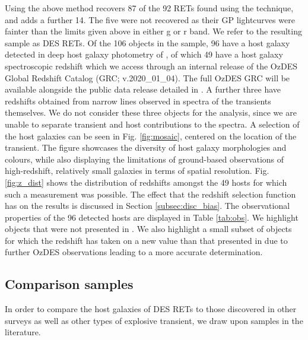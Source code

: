 \documentclass[fleqn,usenatbib,]{mnras}
\newcommand{\replychris}[1]{\color{magenta}#1 \color{black}}
\newcommand{\replylluis}[1]{\color{green}#1 \color{black}}
\begin{document}
Using the above method recovers 87 of the 92 RETs found using the  technique, and adds a further 14. The five were not recovered as their GP lightcurves were fainter than the limits given above in either g or r band.
We refer to the resulting sample as DES RETs. Of the 106 objects in the sample, 96 have a host galaxy detected in deep host galaxy photometry of \citet{Wiseman2020}, of which 49 have a host galaxy spectroscopic redshift \replychris{which we access through an internal release of the OzDES Global Redshift Catalog (GRC; v.2020\_01\_04). The full OzDES GRC will be available alongside the public data release detailed in \citet{Lidman2020}}. A further three have redshifts obtained from narrow lines observed in spectra of the transients themselves. We do not consider these three objects for the analysis, since we are unable to separate transient and host contributions to the spectra.
\replylluis{A selection of the host galaxies can be seen in Fig. \ref{fig:mosaic}, centered on the location of the transient. The figure showcases the diversity of host galaxy morphologies and colours, while also displaying the limitations of ground-based observations of high-redshift, relatively small galaxies in terms of spatial resolution.}
Fig. \ref{fig:z_dist} shows the distribution of redshifts amongst the 49 hosts for which such a measurement was possible. The effect that the redshift selection function has on the results is discussed in Section \ref{subsec:disc_bias}.
The observational properties of the 9\replylluis{6} detected hosts are displayed in Table \ref{tab:obs}. We highlight objects that were not presented in . We also highlight a small subset of objects for which the redshift has taken on a new value than that presented in  due to further OzDES observations leading to a more accurate determination. 

\subsection{Comparison samples \label{subsec:comparison}}

In order to compare the host galaxies of DES RETs to those discovered in other surveys as well as other types of explosive transient, we draw upon samples in the literature. 
\end{document}
